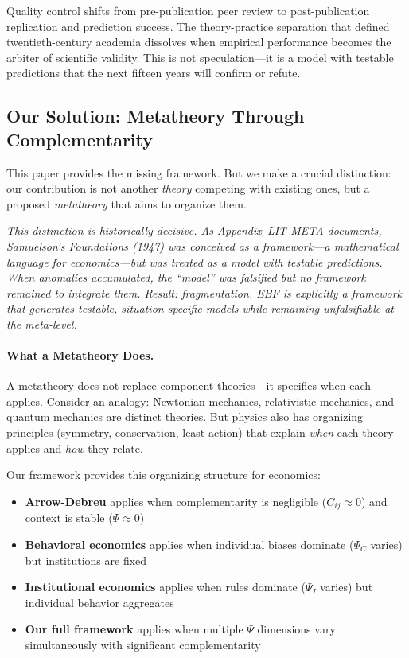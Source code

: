 Quality control shifts from pre-publication peer review to post-publication replication and prediction success. The theory-practice separation that defined twentieth-century academia dissolves when empirical performance becomes the arbiter of scientific validity. This is not speculation---it is a model with testable predictions that the next fifteen years will confirm or refute.

\subsection{Our Solution: Metatheory Through Complementarity}
\label{sec:intro-metatheory}

This paper provides the missing framework. But we make a crucial distinction: our contribution is not another \emph{theory} competing with existing ones, but a proposed \emph{metatheory} that aims to organize them.

\textit{This distinction is historically decisive. As Appendix~LIT-META documents,
Samuelson's \emph{Foundations} (1947) was conceived as a framework---a mathematical
language for economics---but was treated as a model with testable predictions. When
anomalies accumulated, the ``model'' was falsified but no framework remained to integrate
them. Result: fragmentation. EBF is explicitly a framework that generates testable,
situation-specific models while remaining unfalsifiable at the meta-level.}

\paragraph{What a Metatheory Does.}
A metatheory does not replace component theories---it specifies when each applies. Consider an analogy: Newtonian mechanics, relativistic mechanics, and quantum mechanics are distinct theories. But physics also has organizing principles (symmetry, conservation, least action) that explain \emph{when} each theory applies and \emph{how} they relate.

Our framework provides this organizing structure for economics:

\begin{itemize}
    \item \textbf{Arrow-Debreu} applies when complementarity is negligible ($C_{ij} \approx 0$) and context is stable ($\dot{\Psi} \approx 0$)
    \item \textbf{Behavioral economics} applies when individual biases dominate ($\Psi_C$ varies) but institutions are fixed
    \item \textbf{Institutional economics} applies when rules dominate ($\Psi_I$ varies) but individual behavior aggregates
    \item \textbf{Our full framework} applies when multiple $\Psi$ dimensions vary simultaneously with significant complementarity
\end{itemize}

